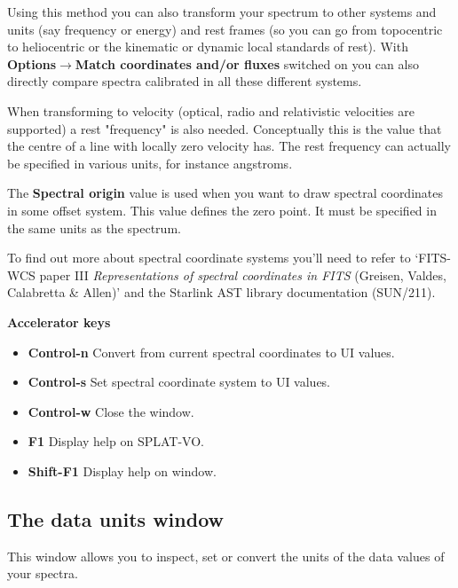 \documentclass[twoside,11pt]{article}
\newcommand{\latexhtml}[2]{#1}
\newcommand{\xref}[3]{#1}
\renewcommand{\_}{\texttt{\symbol{95}}}
\newcommand{\SPLAT}{\textsf{SPLAT-VO}}
\newcommand{\submenuitem}[2]{\latexhtml{\textbf{#1$\rightarrow$#2}}{\textbf{#1->#2}}}
\newcommand{\labelitem}[1]{\textbf{#1}}
\newcommand{\subheading}[1]{\textbf{\large{#1}}}
\begin{document}
Using this method you can also transform your spectrum to other systems and
units (say frequency or energy) and rest frames (so you can go from
topocentric to heliocentric or the kinematic or dynamic local standards of
rest). With \submenuitem{Options}{Match coordinates and/or fluxes} switched on
you can also directly compare spectra calibrated in all these different
systems.

When transforming to velocity (optical, radio and relativistic velocities are
supported) a rest "frequency" is also needed.  Conceptually this is the value
that the centre of a line with locally zero velocity has. The rest frequency
can actually be specified in various units, for instance angstroms.

The \labelitem{Spectral origin} value is used when you want to draw spectral
coordinates in some offset system. This value defines the zero point. It must
be specified in the same units as the spectrum.

To find out more about spectral coordinate systems you'll need to refer to
`FITS-WCS paper III
\textit{Representations of spectral coordinates in FITS}
(Greisen, Valdes, Calabretta \& Allen)' and the Starlink AST library
documentation (\xref{SUN/211}{sun211}{ss_specframes}).

\subheading{Accelerator keys}

\begin{itemize}
\item \labelitem{Control-n} Convert from current spectral coordinates to UI values.
\item \labelitem{Control-s} Set spectral coordinate system to UI values.
\item \labelitem{Control-w} Close the window.
\item \labelitem{F1} Display help on \SPLAT.
\item \labelitem{Shift-F1} Display help on window.
\end{itemize}

\newpage
\subsection{The data units window}

This window allows you to inspect, set or convert the units of the data values
of your spectra.
\end{document}
